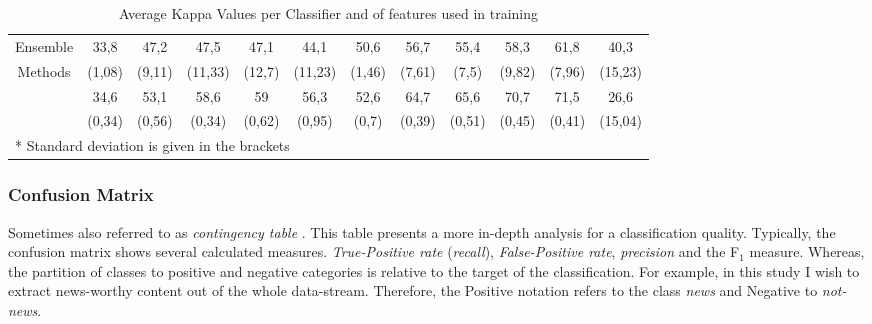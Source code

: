 \begin{table}[H]
{\begin{tabular}{c|ccccc | ccccc | c}
				\vspace*{-2mm}
				Ensemble & 33,8 & 47,2 & 47,5 & 47,1 & 44,1 & 50,6 & 56,7 & 55,4 & 58,3 & 61,8 & 40,3 \\
				Methods & (1,08) & (9,11) & (11,33) & (12,7) & (11,23) & (1,46) & (7,61) & (7,5) & (9,82) & (7,96) & (15,23) \\
				\vspace*{-2mm}
				\multirow{2}{*}{Vote} & 34,6 & 53,1 & 58,6 & 59 & 56,3 & 52,6 & 64,7 & 65,6 & 70,7 & 71,5 & 26,6 \\
					& (0,34) & (0,56) & (0,34) & (0,62) & (0,95) & (0,7) & (0,39) & (0,51) & (0,45) & (0,41) & (15,04) \\
				\hline\hline	
				\multicolumn{11}{l}{* Standard deviation is given in the brackets}\\			
			\end{tabular}
			}
			\captionsetup{width=0.8\textwidth}
			\caption[Average Kappa Values]{Average Kappa Values per Classifier and \textnumero of features used in training}
			\label{tab:kappa}%
		\end{table}%
		
		\subsubsection{Confusion Matrix}		
		Sometimes also referred to as \textit{contingency table} \cite{fawcett2006roc}. This table presents a more in-depth analysis for a classification quality. Typically, the confusion matrix shows several calculated measures. \textit{True-Positive rate} (\textit{recall}), \textit{False-Positive rate}, \textit{precision} and the F$ _1 $ measure. Whereas, the partition of classes to positive and negative categories is relative to the target of the classification. For example, in this study I wish to extract news-worthy content out of the whole data-stream. Therefore, the Positive notation refers to the class \textit{news} and Negative to \textit{not-news}. 
		
